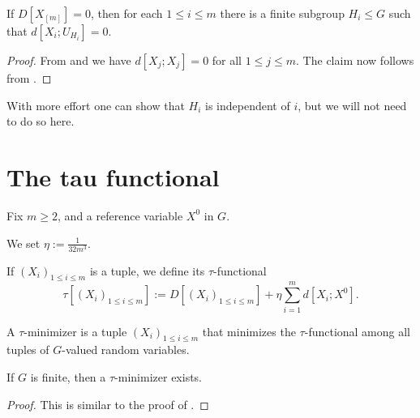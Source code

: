 \begin{proposition}[Vanishing]\label{multi-zero}\leanok
If $D[X_{[m]}]=0$, then for each $1 \leq i \leq m$ there is a finite subgroup $H_i \leq G$ such that $d[X_i; U_{H_i}] = 0$.
\end{proposition}

\begin{proof}\leanok  From  and  we have $d[X_j; X_j]=0$ for all $1 \leq j \leq m$.  The claim now follows from .
\end{proof}

With more effort one can show that $H_i$ is independent of $i$, but we will not need to do so here.

\section{The tau functional}

Fix $m \geq 2$, and a reference variable $X^0$ in $G$.

\begin{definition}[$\eta$]\label{eta-def-multi}\leanok
We set $\eta := \frac{1}{32m^3}$.
\end{definition}

\begin{definition}\label{tau-def-multi}\leanok  If $(X_i)_{1 \leq i \leq m}$ is a tuple, we define its $\tau$-functional
$$ \tau[ (X_i)_{1 \leq i \leq m}] := D[(X_i)_{1 \leq i \leq m}] + \eta \sum_{i=1}^m d[X_i; X^0].$$
\end{definition}

\begin{definition}\label{tau-min-multi}\leanok  A $\tau$-minimizer is a tuple $(X_i)_{1 \leq i \leq m}$ that minimizes the $\tau$-functional among all tuples of $G$-valued random variables.
\end{definition}

\begin{proposition}\label{tau-min-exist-multi}\leanok  If $G$ is finite, then a $\tau$-minimizer exists.
\end{proposition}

\begin{proof}\leanok This is similar to the proof of .
\end{proof}

